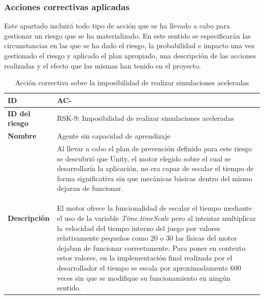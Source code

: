 \subsubsection{Acciones correctivas aplicadas}

Este apartado incluirá todo tipo de acción que se ha llevado a cabo para gestionar un riesgo que se ha materializado. En este sentido se especificarán las circunstancias en las que se ha dado el riesgo, la probabilidad e impacto una vez gestionado el riesgo y aplicado el plan apropiado, una descripción de las acciones realizadas y el efecto que las mismas han tenido en el proyecto.


\setcounter{contador_accion_correctiva}{1}

\begin{center}
	\begin{longtable}{ | p{5.6cm} | p{8.5cm} | } 
		
		\caption{Acción correctiva sobre la imposibilidad de realizar simulaciones aceleradas}\\
		
		\hline
		\textbf{ID} & AC-\arabic{contador_accion_correctiva}\label{tab:tabla_riesgo_escalado}
		{contador_accion_correctiva} \\
		
		
		\hline 
		\textbf{ID del riesgo} & RSK-9: Imposibilidad de realizar simulaciones aceleradas \\
		
		\hline 
		\textbf{Nombre} &
		Agente sin capacidad de aprendizaje\\ 
		
		\hline
		\textbf{Descripción} &
		\pbox{8.4cm}{ 
			Al llevar a cabo el plan de prevención definido para este riesgo se descubrió que Unity, el motor elegido sobre el cual se desarrollaría la aplicación, no era capaz de escalar el tiempo de forma significativa sin que mecánicas básicas dentro del mismo dejaran de funcionar.\\\\El motor ofrece la funcionalidad de escalar el tiempo mediante el uso de la variable \textit{Time.timeScale} pero al intentar multiplicar la velocidad del tiempo interno del juego por valores relativamente pequeños como 20 o 30 las físicas del motor dejaban de funcionar correctamente. Para poner en contexto estos valores, en la implementación final realizada por el desarrollador el tiempo se escala por aproximadamente 600 veces sin que se modifique su funcionamiento en ningún sentido.
		}
		\\
		

\end{longtable}
\end{center}

